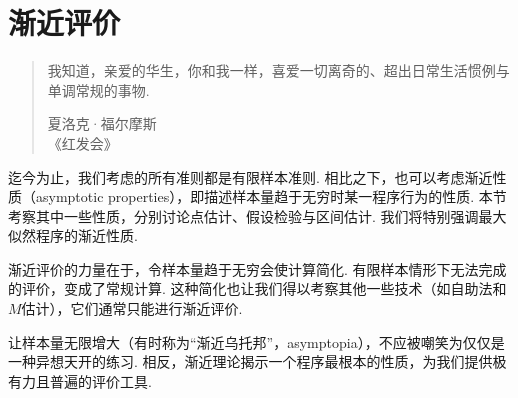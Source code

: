 \section{渐近评价}\label{sec:10}
\begin{quote}
我知道，亲爱的华生，你和我一样，喜爱一切离奇的、超出日常生活惯例与单调常规的事物.
\begin{flushright}夏洛克·福尔摩斯\\《红发会》\end{flushright}
\end{quote}

迄今为止，我们考虑的所有准则都是有限样本准则. 相比之下，也可以考虑渐近性质（asymptotic properties），即描述样本量趋于无穷时某一程序行为的性质. 本节考察其中一些性质，分别讨论点估计、假设检验与区间估计. 我们将特别强调最大似然程序的渐近性质.

渐近评价的力量在于，令样本量趋于无穷会使计算简化. 有限样本情形下无法完成的评价，变成了常规计算. 这种简化也让我们得以考察其他一些技术（如自助法和$M$估计），它们通常只能进行渐近评价.

让样本量无限增大（有时称为“渐近乌托邦”，asymptopia），不应被嘲笑为仅仅是一种异想天开的练习. 相反，渐近理论揭示一个程序最根本的性质，为我们提供极有力且普遍的评价工具.






